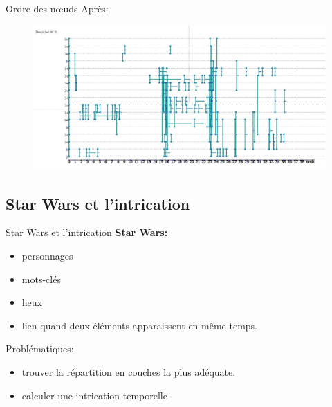 \documentclass[15pt]{beamer}
\begin{document}
\begin{frame}{Ordre des n\oe{}uds}
    Après: 
    
    \begin{figure}
        \centering
        \includegraphics[width=\textwidth]{img/ordonne.JPG}
        \label{fig:my_label}
    \end{figure}
\end{frame}

\subsection{Star Wars et l'intrication }
\begin{frame}{Star Wars et l'intrication}
    \textbf{Star Wars: }
    \begin{itemize}
        \item personnages
        \item mots-clés
        \item lieux 
        \item lien quand deux éléments apparaissent en même temps.
    \end{itemize}
    Problématiques: 
    \begin{itemize}
        \item trouver la répartition en couches la plus adéquate.
        \item calculer une intrication \og temporelle \fg{}
    \end{itemize}
\end{frame}
\end{document}
